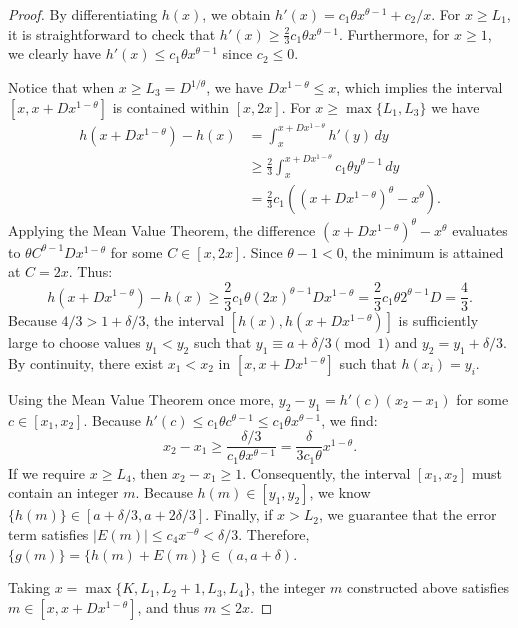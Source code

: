 \documentclass[12pt]{amsart}
\numberwithin{equation}{section}
\begin{document}
\begin{proof}
By differentiating $h(x)$, we obtain $h'(x) = c_{1}\theta x^{\theta-1} + c_{2}/x$. For $x \geq L_{1}$, it is straightforward to check that $h'(x) \geq \frac{2}{3}c_{1}\theta x^{\theta-1}$. Furthermore, for $x \geq 1$, we clearly have $h'(x) \leq c_{1}\theta x^{\theta-1}$ since $c_2 \leq 0$. 

Notice that when $x \geq L_{3} = D^{1/\theta}$, we have $Dx^{1-\theta} \leq x$, which implies the interval $[x, x+Dx^{1-\theta}]$ is contained within $[x, 2x]$. For $x \geq \max\{L_1, L_3\}$ we have
\begin{align*}
h(x+Dx^{1-\theta}) - h(x) &= \int_{x}^{x+Dx^{1-\theta}} h'(y) \, dy \\
&\geq \frac{2}{3} \int_x^{x+Dx^{1-\theta}} c_1 \theta y^{\theta-1} \, dy \\
&= \frac{2}{3} c_1 \left( (x+Dx^{1-\theta})^\theta - x^\theta \right).
\end{align*}
Applying the Mean Value Theorem, the difference $(x+Dx^{1-\theta})^\theta - x^\theta$ evaluates to $\theta C^{\theta-1} Dx^{1-\theta}$ for some $C \in [x, 2x]$. Since $\theta - 1 < 0$, the minimum is attained at $C = 2x$. Thus:
\begin{equation*}
h(x+Dx^{1-\theta}) - h(x) \geq \frac{2}{3} c_1 \theta (2x)^{\theta-1} D x^{1-\theta} = \frac{2}{3} c_1 \theta 2^{\theta-1} D = \frac{4}{3}.
\end{equation*}
Because $4/3 > 1 + \delta/3$, the interval $[h(x), h(x+Dx^{1-\theta})]$ is sufficiently large to choose values $y_{1} < y_{2}$ such that $y_1 \equiv a + \delta/3 \pmod 1$ and $y_{2} = y_{1} + \delta/3$. By continuity, there exist $x_1 < x_2$ in $[x, x+Dx^{1-\theta}]$ such that $h(x_i) = y_i$. 

Using the Mean Value Theorem once more, $y_2 - y_1 = h'(c)(x_2 - x_1)$ for some $c \in [x_1, x_2]$. Because $h'(c) \leq c_1 \theta c^{\theta-1} \leq c_1 \theta x^{\theta-1}$, we find:
\begin{equation*}
x_{2}-x_{1} \geq \frac{\delta/3}{c_1 \theta x^{\theta-1}} = \frac{\delta}{3 c_{1}\theta}x^{1-\theta}.
\end{equation*}
If we require $x \geq L_{4}$, then $x_{2}-x_{1} \geq 1$. Consequently, the interval $[x_{1},x_{2}]$ must contain an integer $m$. Because $h(m) \in [y_1, y_2]$, we know $\{h(m)\} \in [a+\delta/3, a+2\delta/3]$. Finally, if $x > L_2$, we guarantee that the error term satisfies $|E(m)| \leq c_4 x^{-\theta} < \delta/3$. Therefore, $\{g(m)\} = \{h(m) + E(m)\} \in (a, a+\delta)$.

Taking $x = \max\{K, L_1, L_2+1, L_3, L_4\}$, the integer $m$ constructed above satisfies $m \in [x,x+Dx^{1-\theta}]$, and thus $m \leq 2x$.
\end{proof}
\end{document}
